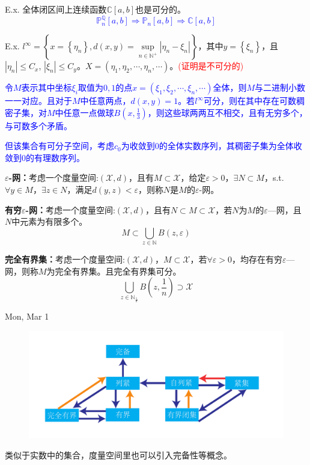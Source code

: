 E.x. 全体闭区间上连续函数$\mathbb{C}[a, b]$也是可分的。
\textcolor{blue}{\begin{equation*}
    \mathbb{P}_n^{\mathbb{Q}} [a, b] \Longrightarrow \mathbb{P}_n[a, b] \Longrightarrow \mathbb{C}[a, b]
\end{equation*}}

E.x. $l^{\infty} = \left\lbrace x = \left\lbrace \eta_n \right\rbrace, d(x, y) = \sup\limits_{n\in\mathbb{N}^+} |\eta_n - \xi_n | \right\rbrace$，其中$y = \left\lbrace\xi_n\right\rbrace$，且$|\eta_n|\le C_x$, $|\xi_n| \le C_y$。$X = (\eta_1, \eta_2,\cdots, \eta_n, \cdots)$。\textcolor{red}{(证明是不可分的)}

\textcolor{blue}{令$M$表示其中坐标$\xi_i$取值为$0, 1$的点$x = (\xi_1, \xi_2, \cdots, \xi_n , \cdots)$全体，则$M$与二进制小数一一对应。且对于$M$中任意两点，$d(x, y) = 1$。若$l^{\infty}$可分，则在其中存在可数稠密子集，对$M$中任意一点做球$B\left(x, \frac{1}{3}\right)$，则这些球两两互不相交，且有无穷多个，与可数多个矛盾。}

\textcolor{blue}{但该集合有可分子空间，考虑$c_0$为收敛到$0$的全体实数序列，其稠密子集为全体收敛到0的有理数序列。}

\bigskip \noindent \textbf{$\varepsilon$-网：}考虑一个度量空间:$(\mathscr{X},d)$，且有$M\subset \mathscr{X}$，给定$\varepsilon >0$，$\exists N\subset M$，s.t. $\forall y\in M$，$\exists z\in N$，满足$d(y, z)<\varepsilon$，则称$N$是$M$的$\varepsilon$-网。

\textbf{有穷$\varepsilon$-网：}考虑一个度量空间:$(\mathscr{X},d)$，且有$N\subset M\subset \mathscr{X}$，若$N$为$M$的$\varepsilon$—网，且$N$中元素为有限多个。
\begin{equation*}
    M\subset \bigcup\limits_{z\in\mathbb{N}} B(z, \varepsilon)
\end{equation*}

\textbf{完全有界集：}考虑一个度量空间:$(\mathscr{X},d)$，$M\subset \mathscr{X}$，若$\forall \varepsilon >0$，均存在有穷$\varepsilon$—网，则称$M$为完全有界集。且完全有界集可分。
\begin{equation*}
    \bigcup\limits_{z\in\mathbb{N}_{\frac{1}{n}}} B(z, \frac{1}{n}) \supset \mathscr{X}
\end{equation*}

\bigskip
\begin{center}
    Mon, Mar 1
\end{center}
\begin{figure}[h]
    \centering
    \includegraphics[scale = 0.4]{ideo.pdf}
\end{figure}
类似于实数中的集合，度量空间里也可以引入完备性等概念。

